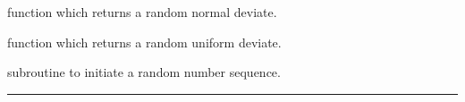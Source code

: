 \begin{related}
  \begin{sulist}{} %
  \item[\htmlref{rand\_gauss}{sub:rand_gauss}] function which returns a  random normal deviate.
  \item[\htmlref{rand\_uni}{sub:rand_uni}] function which returns a random uniform deviate.
   \item[\htmlref{rand\_init}{sub:rand_init}] subroutine to initiate a random number sequence. 
  \end{sulist}
\end{related}

\rule{\hsize}{2mm}

\newpage
